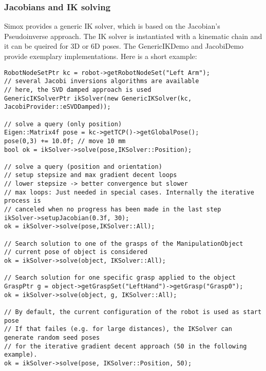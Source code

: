 \subsubsection*{Jacobians and IK solving}
Simox provides a generic IK solver, which is based on the Jacobian's Pseudoinverse approach. The IK solver is instantiated with a kinematic chain and it can be queired for 3D or 6D poses. The GenericIKDemo and JacobiDemo provide exemplary implementations. Here is a short example:
\begin{lstlisting}
RobotNodeSetPtr kc = robot->getRobotNodeSet("Left Arm");
// several Jacobi inversions algorithms are available
// here, the SVD damped approach is used
GenericIKSolverPtr ikSolver(new GenericIKSolver(kc, JacobiProvider::eSVDDamped));

// solve a query (only position)
Eigen::Matrix4f pose = kc->getTCP()->getGlobalPose();
pose(0,3) += 10.0f; // move 10 mm
bool ok = ikSolver->solve(pose,IKSolver::Position);

// solve a query (position and orientation)
// setup stepsize and max gradient decent loops
// lower stepsize -> better convergence but slower
// max loops: Just needed in special cases. Internally the iterative process is
// canceled when no progress has been made in the last step
ikSolver->setupJacobian(0.3f, 30); 
ok = ikSolver->solve(pose,IKSolver::All);

// Search solution to one of the grasps of the ManipulationObject
// current pose of object is considered
ok = ikSolver->solve(object, IKSolver::All);

// Search solution for one specific grasp applied to the object
GraspPtr g = object->getGraspSet("LeftHand")->getGrasp("Grasp0");
ok = ikSolver->solve(object, g, IKSolver::All);

// By default, the current configuration of the robot is used as start pose
// If that failes (e.g. for large distances), the IKSolver can generate random seed poses
// for the iterative gradient decent approach (50 in the following example).
ok = ikSolver->solve(pose, IKSolver::Position, 50);
\end{lstlisting}
